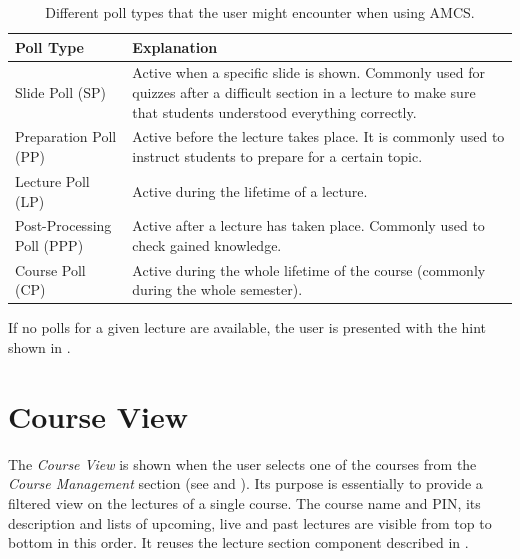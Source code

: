 \begin{table}[H]
	{\renewcommand{\arraystretch}{2}
		\begin{tabular}{ | p{5cm} | p{10cm} |}
			\hline
			Poll Type & Explanation \\ \hline \hline
			Slide Poll (SP) & Active when a specific slide is shown. Commonly used for quizzes after a difficult section in a lecture to make sure that students understood everything correctly. \\ \hline
			Preparation Poll (PP) & Active before the lecture takes place. It is commonly used to instruct students to prepare for a certain topic. \\ \hline
			Lecture Poll (LP) & Active during the lifetime of a lecture. \\ \hline
			Post-Processing Poll (PPP) & Active after a lecture has taken place. Commonly used to check gained knowledge. \\ \hline
			Course Poll (CP) & Active during the whole lifetime of the course (commonly during the whole semester). \\
			\hline
		\end{tabular}
	}
	\caption{Different poll types that the user might encounter when using AMCS.}
	\label{tab:pollTypes}
\end{table}

If no polls for a given lecture are available, the user is presented with the hint shown in \todogrf.

\section{Course View}
\label{section:soa:courseview}

The \emph{Course View} is shown when the user selects one of the courses from the \emph{Course Management} section (see  and ). Its purpose is essentially to provide a filtered view on the lectures of a single course.
The course name and PIN, its description and lists of upcoming, live and past lectures are visible from top to bottom in this order. It reuses the lecture section component described in .

